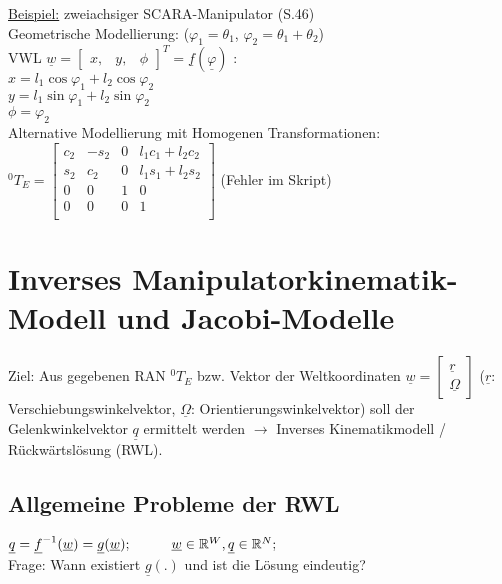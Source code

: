 \documentclass[a4paper,landscape,6pt]{article}
\newcommand{\mat}[1]{\ensuremath{\begin{bmatrix} #1 \end{bmatrix}}}				%
\newcommand{\ul}[1]{\underline{#1}}
\begin{document}
\begin{multicols}{3}
\ul{Beispiel:} zweiachsiger SCARA-Manipulator (S.46)\\
Geometrische Modellierung: ($\varphi_1 = \theta_1$, $\varphi_2 = \theta_1 + \theta_2$)\\
VWL $\ul w = \mat{x ,& y , & \phi}^T = \ul f(\ul \varphi)$ :\\
$x=l_1 \cos \varphi_1 + l_2 \cos \varphi_2$\\
$y=l_1 \sin \varphi_1 + l_2 \sin \varphi_2$\\
$\phi = \varphi_2$\\
Alternative Modellierung mit Homogenen Transformationen:\\
${}^{0}{T}_E= \mat{c_2 & -s_2 & 0 & l_1 c_1 + l_2 c_2\\
	s_2 & c_2 & 0 & l_1 s_1 + l_2 s_2 \\
	0 & 0 & 1 & 0 \\
	0 & 0 & 0 & 1 \\ }$ (Fehler im Skript)\\
\section{Inverses Manipulatorkinematik-Modell und Jacobi-Modelle}
Ziel: Aus gegebenen RAN ${}^{0}{T}_E$ bzw. Vektor der Weltkoordinaten $ \ul w = \mat{\ul r \\ \ul \Omega}$ ($\ul r$: Verschiebungswinkelvektor, $\ul \Omega$: Orientierungswinkelvektor) soll der Gelenkwinkelvektor $\ul q$ ermittelt werden $\rightarrow$ Inverses Kinematikmodell / Rückwärtslösung (RWL).
\subsection*{Allgemeine Probleme der RWL}
$\ul q = \ul f^{-1}(\ul w) = \ul g (\ul w); \tab \ul w \in \mathbb{R}^W, \ul q \in \mathbb{R}^N;$\\
Frage: Wann existiert $\ul g(.)$ und ist die Lösung eindeutig?\\


\end{multicols}
\end{document}
